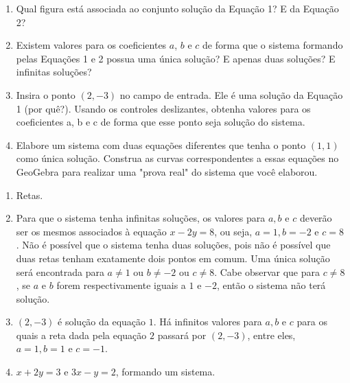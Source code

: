 \documentclass[10 pt,usenames,dvipsnames, oneside]{article}
\begin{document}
\begin{enumerate}
\item{} 
Qual figura está associada ao conjunto solução da Equação 1? E da Equação 2?

\item{}
Existem valores para os coeficientes $a$, $b$ e $c$ de forma que o sistema formando pelas Equações 1 e 2 possua uma única solução? E apenas duas soluções? E infinitas soluções?

\item{}
Insira o ponto $(2,-3)$ no campo de entrada. Ele é uma solução da Equação 1 (por quê?). Usando os controles deslizantes, obtenha valores para os coeficientes a, b e c de forma que esse ponto seja solução do sistema.

\item{}
Elabore um sistema com duas equações diferentes que tenha o ponto $(1, 1)$ como única solução. Construa as curvas correspondentes a essas equações no GeoGebra para realizar uma "prova real"{} do sistema que você elaborou.
\end{enumerate}

\ifdefined\prof
\clearpage
\begin{solucao}

\begin{enumerate}
\item Retas.
\item Para que o sistema tenha infinitas soluções, os valores para $a, b$ e $c$ deverão ser os mesmos associados à equação $x-2y=8$, ou seja, $a=1, b=-2$ e $c=8$. Não é possível que o sistema tenha duas soluções, pois não é possível que duas retas tenham exatamente  dois pontos em comum. Uma única solução será encontrada para $a\neq 1$ ou $b \neq -2$ ou $c \neq 8$. Cabe observar que para $c \neq 8$, se $a$ e $b$ forem respectivamente iguais a $1$ e $-2$, então o sistema não terá solução.
\item $(2,-3)$ é solução da equação $1$. Há infinitos valores para $a, b$ e $c$ para os quais a reta dada pela equação $2$ passará por $(2,-3)$, entre eles, $a=1, b=1$ e $c=-1$.
\item $x+2y=3$ e $3x-y=2$, formando um sistema.
\end{enumerate}

\end{solucao}
\fi
\end{document}
